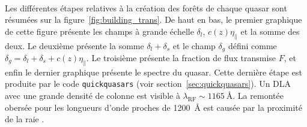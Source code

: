 \paragraph{}

  Les différentes étapes relatives à la création des forêts de chaque quasar sont résumées sur la figure~\ref{fig:building_trans}. De haut en bas, le premier graphique de cette figure présente les champs à grande échelle $\delta_l$, $c(z)\eta_{\parallel}$ et la somme des deux. Le deuxième présente la somme $\delta_l + \delta_s$ et le champ $\delta_g$ défini comme $\delta_g = \delta_l + \delta_s + c(z) \eta_{\parallel}$. Le troisième présente la fraction de flux transmise $F$, et enfin le dernier graphique présente le spectre du quasar. Cette dernière étape est produite par le code \texttt{quickquasars} (voir section~\ref{sec:quickquasars}). Un DLA avec une grande densité de colonne est visible à $\lambda_{\mathrm{RF}} \sim \SI{1165}{\angstrom}$. La remontée obersée pour les longueurs d'onde proches de \SI{1200}{\angstrom} est causée par la proximité de la raie \lya{}.
  

